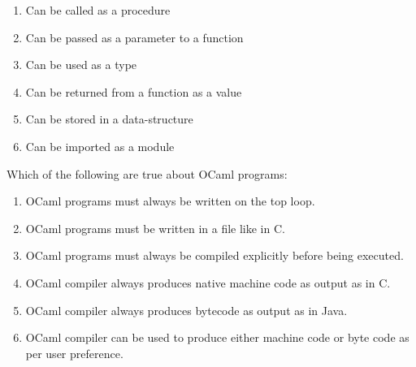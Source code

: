 \documentclass[addpoints,11pt]{exam}
\begin{document}
\begin{questions}
\begin{enumerate}
\item Can be called as a procedure
\item Can be passed as a parameter to a function
\item Can be used as a type
\item Can be returned from a function as a value
\item Can be stored in a data-structure
\item Can be imported as a module
\end{enumerate}\question Which of the following are true about OCaml programs:
\begin{enumerate}
\item OCaml programs must always be written on the top loop.
\item OCaml programs must be written in a file like in C.
\item OCaml programs must always be compiled explicitly before being executed.
\item OCaml compiler always produces native machine code as output as in C.
\item OCaml compiler always produces bytecode as output as in Java.
\item OCaml compiler can be used to produce either machine code or byte code as per user preference.
\end{enumerate}\end{questions}
\end{document}
